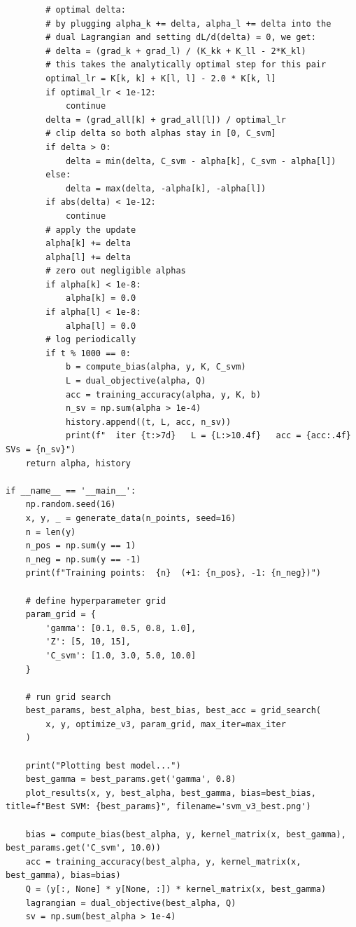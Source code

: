 \documentclass[11pt]{article}
\theoremstyle{mystyle}
\begin{document}
\begin{verbatim}
        # optimal delta:
        # by plugging alpha_k += delta, alpha_l += delta into the
        # dual Lagrangian and setting dL/d(delta) = 0, we get:
        # delta = (grad_k + grad_l) / (K_kk + K_ll - 2*K_kl)
        # this takes the analytically optimal step for this pair
        optimal_lr = K[k, k] + K[l, l] - 2.0 * K[k, l]
        if optimal_lr < 1e-12:
            continue
        delta = (grad_all[k] + grad_all[l]) / optimal_lr
        # clip delta so both alphas stay in [0, C_svm]
        if delta > 0:
            delta = min(delta, C_svm - alpha[k], C_svm - alpha[l])
        else:
            delta = max(delta, -alpha[k], -alpha[l])
        if abs(delta) < 1e-12:
            continue
        # apply the update
        alpha[k] += delta
        alpha[l] += delta
        # zero out negligible alphas
        if alpha[k] < 1e-8:
            alpha[k] = 0.0
        if alpha[l] < 1e-8:
            alpha[l] = 0.0
        # log periodically
        if t % 1000 == 0:
            b = compute_bias(alpha, y, K, C_svm)
            L = dual_objective(alpha, Q)
            acc = training_accuracy(alpha, y, K, b)
            n_sv = np.sum(alpha > 1e-4)
            history.append((t, L, acc, n_sv))
            print(f"  iter {t:>7d}   L = {L:>10.4f}   acc = {acc:.4f}   SVs = {n_sv}")
    return alpha, history

if __name__ == '__main__':
    np.random.seed(16)
    x, y, _ = generate_data(n_points, seed=16)
    n = len(y)
    n_pos = np.sum(y == 1)
    n_neg = np.sum(y == -1)
    print(f"Training points:  {n}  (+1: {n_pos}, -1: {n_neg})")

    # define hyperparameter grid
    param_grid = {
        'gamma': [0.1, 0.5, 0.8, 1.0],
        'Z': [5, 10, 15],
        'C_svm': [1.0, 3.0, 5.0, 10.0]
    }

    # run grid search
    best_params, best_alpha, best_bias, best_acc = grid_search(
        x, y, optimize_v3, param_grid, max_iter=max_iter
    )

    print("Plotting best model...")
    best_gamma = best_params.get('gamma', 0.8)
    plot_results(x, y, best_alpha, best_gamma, bias=best_bias, title=f"Best SVM: {best_params}", filename='svm_v3_best.png')

    bias = compute_bias(best_alpha, y, kernel_matrix(x, best_gamma), best_params.get('C_svm', 10.0))
    acc = training_accuracy(best_alpha, y, kernel_matrix(x, best_gamma), bias=bias)
    Q = (y[:, None] * y[None, :]) * kernel_matrix(x, best_gamma)
    lagrangian = dual_objective(best_alpha, Q)
    sv = np.sum(best_alpha > 1e-4)


\end{verbatim}
\end{document}
